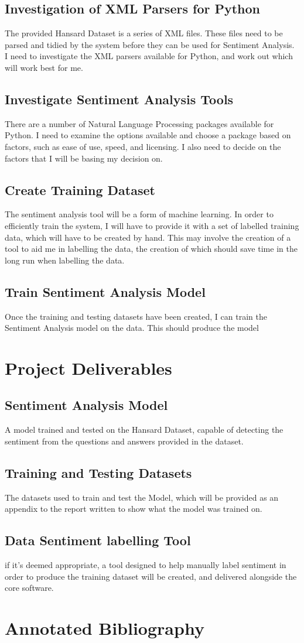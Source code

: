 \documentclass[draft]{article}
\begin{document}
\subsection{Investigation of XML Parsers for Python}
The provided Hansard Dataset is a series of XML files. These files need to be parsed and tidied by the system before they can be used for Sentiment Analysis. I need to investigate the XML parsers available for Python, and work out which will work best for me.
\subsection{Investigate Sentiment Analysis Tools}
There are a number of Natural Language Processing packages available for Python. I need to examine the options available and choose a package based on factors, such as ease of use, speed, and licensing. I also need to decide on the factors that I will be basing my decision on.
\subsection{Create Training Dataset}
The sentiment analysis tool will be a form of machine learning. In order to efficiently train the system, I will have to provide it with a set of labelled training data, which will have to be created by hand. This may involve the creation of a tool to aid me in labelling the data,
the creation of which should save time in the long run when labelling the data.
\subsection{Train Sentiment Analysis Model}
Once the training and testing datasets have been created, I can train the Sentiment Analysis model on the data. This should produce the model 
\section{Project Deliverables}
\subsection{Sentiment Analysis Model}
A model trained and tested on the Hansard Dataset, capable of detecting the sentiment from the questions and answers provided in the dataset.
\subsection{Training and Testing Datasets}
The datasets used to train and test the Model, which will be provided as an appendix to the report written to show what the model was trained on.
\subsection{Data Sentiment labelling Tool}
if it's deemed appropriate, a tool designed to help manually label sentiment in order to produce the training dataset will be created, and delivered alongside the core software.
\clearpage
\section{Annotated Bibliography}

\end{document}

